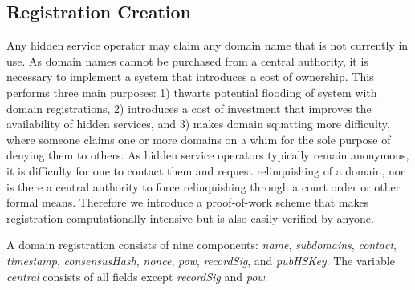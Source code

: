 \subsection{Registration Creation}

Any hidden service operator may claim any domain name that is not currently in use. As domain names cannot be purchased from a central authority, it is necessary to implement a system that introduces a cost of ownership. This performs three main purposes: 1) thwarts potential flooding of system with domain registrations, 2) introduces a cost of investment that improves the availability of hidden services, and 3) makes domain squatting more difficulty, where someone claims one or more domains on a whim for the sole purpose of denying them to others. As hidden service operators typically remain anonymous, it is difficulty for one to contact them and request relinquishing of a domain, nor is there a central authority to force relinquishing through a court order or other formal means. Therefore we introduce a proof-of-work scheme that makes registration computationally intensive but is also easily verified by anyone.

A domain registration consists of nine components: \textit{name}, \textit{subdomains}, \textit{contact}, \textit{timestamp}, \textit{consensusHash}, \textit{nonce}, \textit{pow}, \textit{recordSig}, and \textit{pubHSKey}. The variable \textit{central} consists of all fields except \textit{recordSig} and \textit{pow}.

